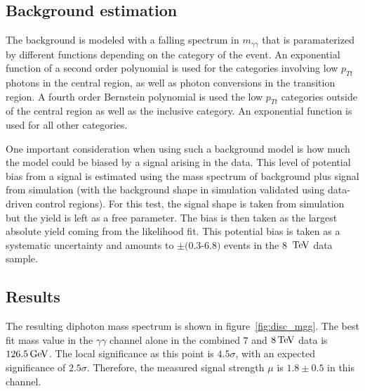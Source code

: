 \subsection{Background estimation}

The background is modeled with a falling spectrum in $m_{\gamma\gamma}$ that is paramaterized by different functions depending on the category of the event. An exponential function of a second order polynomial is used for the categories involving low $p_{Tt}$ photons in the central region, as well as photon conversions in the transition region. A fourth order Bernstein polynomial is used the low $p_{Tt}$ categories outside of the central region as well as the inclusive category. An exponential function is used for all other categories. 

One important consideration when using such a background model is how much the model could be biased by a signal arising in the data. This level of potential bias from a signal is estimated using the mass spectrum of background plus signal from simulation (with the background shape in simulation validated using data-driven control regions). For this test, the signal shape is taken from simulation but the yield is left as a free parameter. The bias is then taken as the largest absolute yield coming from the likelihood fit. This potential bias is taken as a systematic uncertainty and amounts to $\pm(0.3$-$6.8)$ events in the 8 $\TeV$ data sample. 

\subsection{Results}

The resulting diphoton mass spectrum is shown in figure~\ref{fig:disc_mgg}. The best fit mass value in the $\gamma\gamma$ channel alone in the combined $7$ and $8 \TeV$ data is $126.5 \GeV$. The local significance as this point is $4.5\sigma$, with an expected significance of $2.5\sigma$. Therefore, the measured signal strength $\mu$ is $1.8 \pm 0.5$ in this channel. 

